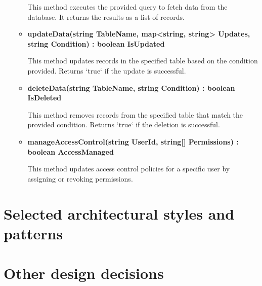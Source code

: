 \begin{itemize}
\begin{itemize}
This method executes the provided query to fetch data from the database. It returns the results as a list of records.

\item \textbf{updateData(string TableName, map<string, string> Updates, string Condition) : boolean IsUpdated}

This method updates records in the specified table based on the condition provided. Returns `true` if the update is successful.

\item \textbf{deleteData(string TableName, string Condition) : boolean IsDeleted}  

This method removes records from the specified table that match the provided condition. Returns `true` if the deletion is successful.

\item \textbf{manageAccessControl(string UserId, string[] Permissions) : boolean AccessManaged}  

This method updates access control policies for a specific user by assigning or revoking permissions.

\end{itemize}
\end{itemize}


\section{Selected architectural styles and patterns}
\section{Other design decisions }
